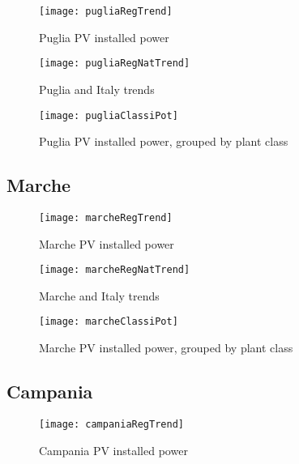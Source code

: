 \documentclass[12pt,a4paper,openright,twoside]{report}
\begin{document}
\begin{figure}[hp]
	\centering
	\texttt{[image: pugliaRegTrend]}
	\caption{Puglia PV installed power}
	\label{pugliaRegTrend}
\end{figure}

\begin{figure}[hp]
	\centering
	\texttt{[image: pugliaRegNatTrend]}
	\caption{Puglia and Italy trends}
	\label{pugliaRegNatTrend}
\end{figure}

\clearpage

\begin{figure}[hp]
	\centering
	\texttt{[image: pugliaClassiPot]}
	\caption{Puglia PV installed power, grouped by plant class}
	\label{pugliaClassiPot}
\end{figure}



\subsection*{Marche}

\begin{figure}[hp]
	\centering
	\texttt{[image: marcheRegTrend]}
	\caption{Marche PV installed power}
	\label{marcheRegTrend}
\end{figure}

\begin{figure}[hp]
	\centering
	\texttt{[image: marcheRegNatTrend]}
	\caption{Marche and Italy trends}
	\label{marcheRegNatTrend}
\end{figure}

\begin{figure}[hp]
	\centering
	\texttt{[image: marcheClassiPot]}
	\caption{Marche PV installed power, grouped by plant class}
	\label{marcheClassiPot}
\end{figure}

\clearpage

\subsection*{Campania}

\begin{figure}[hp]
	\centering
	\texttt{[image: campaniaRegTrend]}
	\caption{Campania PV installed power}
	\label{campaniaRegTrend}
\end{figure}
\end{document}
